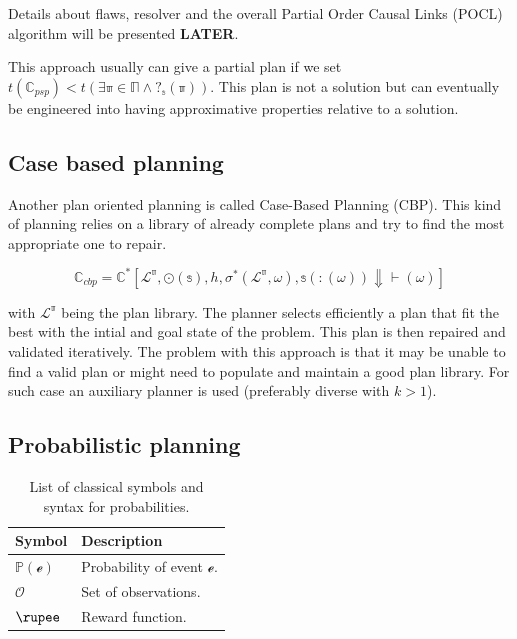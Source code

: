 \documentclass[11pt,a4paper,twoside,openright,titlepage,numbers=noenddot,headinclude,cleardoublepage=empty,openany]{scrreprt}
\theoremstyle{plain}
\theoremstyle{definition}
\theoremstyle{remark}
\newcommand{\bb}{\mathbb}
\renewcommand{\cal}{\mathcal}
\begin{document}
Details about flaws, resolver and the overall Partial Order Causal Links
(POCL) algorithm will be presented \textbf{LATER}.

This approach usually can give a partial plan if we set
\(t(\bb{C}_{psp}) < t(\exists \bb{\pi} \in \bb{\Pi} \land ?_{\bb{s}}(\bb{\pi}))\).
This plan is not a solution but can eventually be engineered into having
approximative properties relative to a solution.

\hypertarget{case-based-planning}{%
\subsection{Case based planning}\label{case-based-planning}}

Another plan oriented planning is called Case-Based Planning (CBP). This
kind of planning relies on a library of already complete plans and try
to find the most appropriate one to repair.

\[\bb{C}_{cbp} = \bb{C}^* \left[ \cal{L}^{\bb{\pi}}, \odot(\bb{s}), h, \sigma^*(\cal{L}^{\bb{\pi}}, \omega), \bb{s}(:(\omega)) \Downarrow \vdash(\omega) \right ]\]

with \(\cal{L}^{\bb{\pi}}\) being the plan library. The planner selects
efficiently a plan that fit the best with the intial and goal state of
the problem. This plan is then repaired and validated iteratively. The
problem with this approach is that it may be unable to find a valid plan
or might need to populate and maintain a good plan library. For such
case an auxiliary planner is used (preferably diverse with \(k>1\)).

\hypertarget{probabilistic-planning}{%
\subsection{Probabilistic planning}\label{probabilistic-planning}}

\hypertarget{tbl:proba}{}
\begin{table}\footnotesize
\centering

\caption{\label{tbl:proba}List of classical symbols and syntax for
probabilities.}

\begin{tabular}{@{}ll@{}}
\toprule

\textbf{Symbol} & \textbf{Description} \\\midrule

\(\bb{P}(\cal{e})\) & Probability of event \(\cal{e}\). \\
\(\cal{O}\) & Set of observations. \\
\(\rupee\) & Reward function. \\

\bottomrule
\end{tabular}

\end{table}
\end{document}
